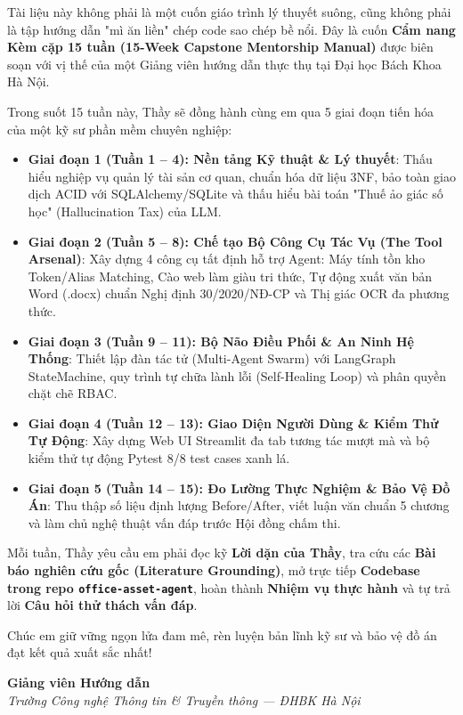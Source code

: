 \documentclass[11pt,a4paper]{article}
\begin{document}
Tài liệu này không phải là một cuốn giáo trình lý thuyết suông, cũng không phải là tập hướng dẫn "mì ăn liền" chép code sao chép bề nổi. Đây là cuốn \textbf{Cẩm nang Kèm cặp 15 tuần (15-Week Capstone Mentorship Manual)} được biên soạn với vị thế của một Giảng viên hướng dẫn thực thụ tại Đại học Bách Khoa Hà Nội.

Trong suốt 15 tuần này, Thầy sẽ đồng hành cùng em qua 5 giai đoạn tiến hóa của một kỹ sư phần mềm chuyên nghiệp:
\begin{itemize}[leftmargin=1.5em]
    \item \textbf{Giai đoạn 1 (Tuần 1 -- 4): Nền tảng Kỹ thuật \& Lý thuyết}: Thấu hiểu nghiệp vụ quản lý tài sản cơ quan, chuẩn hóa dữ liệu 3NF, bảo toàn giao dịch ACID với SQLAlchemy/SQLite và thấu hiểu bài toán "Thuế ảo giác số học" (Hallucination Tax) của LLM.
    \item \textbf{Giai đoạn 2 (Tuần 5 -- 8): Chế tạo Bộ Công Cụ Tác Vụ (The Tool Arsenal)}: Xây dựng 4 công cụ tất định hỗ trợ Agent: Máy tính tồn kho Token/Alias Matching, Cào web làm giàu tri thức, Tự động xuất văn bản Word (.docx) chuẩn Nghị định 30/2020/NĐ-CP và Thị giác OCR đa phương thức.
    \item \textbf{Giai đoạn 3 (Tuần 9 -- 11): Bộ Não Điều Phối \& An Ninh Hệ Thống}: Thiết lập đàn tác tử (Multi-Agent Swarm) với LangGraph StateMachine, quy trình tự chữa lành lỗi (Self-Healing Loop) và phân quyền chặt chẽ RBAC.
    \item \textbf{Giai đoạn 4 (Tuần 12 -- 13): Giao Diện Người Dùng \& Kiểm Thử Tự Động}: Xây dựng Web UI Streamlit đa tab tương tác mượt mà và bộ kiểm thử tự động Pytest 8/8 test cases xanh lá.
    \item \textbf{Giai đoạn 5 (Tuần 14 -- 15): Đo Lường Thực Nghiệm \& Bảo Vệ Đồ Án}: Thu thập số liệu định lượng Before/After, viết luận văn chuẩn 5 chương và làm chủ nghệ thuật vấn đáp trước Hội đồng chấm thi.
\end{itemize}

Mỗi tuần, Thầy yêu cầu em phải đọc kỹ \textbf{Lời dặn của Thầy}, tra cứu các \textbf{Bài báo nghiên cứu gốc (Literature Grounding)}, mở trực tiếp \textbf{Codebase trong repo \texttt{office-asset-agent}}, hoàn thành \textbf{Nhiệm vụ thực hành} và tự trả lời \textbf{Câu hỏi thử thách vấn đáp}.

Chúc em giữ vững ngọn lửa đam mê, rèn luyện bản lĩnh kỹ sư và bảo vệ đồ án đạt kết quả xuất sắc nhất!

\vspace{0.8cm}
\begin{flushright}
    \textbf{Giảng viên Hướng dẫn}\\
    \textit{Trường Công nghệ Thông tin \& Truyền thông — ĐHBK Hà Nội}
\end{flushright}
\end{document}
